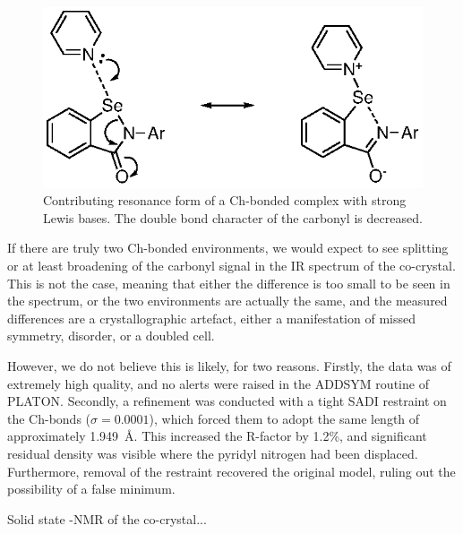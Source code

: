 \begin{refsection}
\begin{figure}
    \centering
    \includegraphics[scale=0.8]{Figures/ch-bond-deloc.eps}
    \caption{Contributing resonance form of a Ch-bonded complex with strong Lewis bases. The double bond character of the carbonyl is decreased.}
    \label{fig:ch-bond-deloc}
\end{figure}

If there are truly two Ch-bonded environments, we would expect to see splitting or at least broadening of the carbonyl signal in the IR spectrum of the co-crystal.
This is not the case, meaning that either the difference is too small to be seen in the spectrum, or the two environments are actually the same, and the measured differences are a crystallographic artefact, either a manifestation of missed symmetry, disorder, or a doubled cell.

However, we do not believe this is likely, for two reasons.
Firstly, the data was of extremely high quality, and no alerts were raised in the ADDSYM routine of PLATON.
Secondly, a refinement was conducted with a tight SADI restraint on the Ch-bonds ($\sigma=0.0001$), which forced them to adopt the same length of approximately 1.949~\AA.
This increased the R-factor by 1.2\%, and significant residual density was visible where the pyridyl nitrogen had been displaced.
Furthermore, removal of the restraint recovered the original model, ruling out the possibility of a false minimum.

Solid state -NMR of the co-crystal...



\end{refsection}
